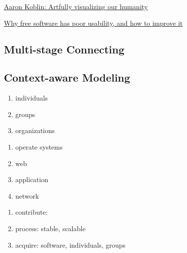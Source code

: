 \documentclass[draftclsnofoot,journal,onecolumn,12pt]{IEEEtran}
\begin{document}
\href{http://www.ted.com/talks/aaron_koblin.html}{Aaron Koblin: Artfully visualizing our humanity}

\href{http://www.mpt.net.nz/2012/06/why-free-software-has-poor-usability/}{Why free software has poor usability, and how to improve it}

\subsection{Multi-stage Connecting}

\subsection{Context-aware Modeling}


\begin{enumerate}
  \item individuals
  \item groups
  \item organizations
\end{enumerate}

\begin{enumerate}
  \item operate systems
  \item web
  \item application
  \item network
\end{enumerate}

\begin{enumerate}
  \item contribute:
  \item process: stable, scalable
  \item acquire: software, individuals, groups
\end{enumerate}


\nocite{Bonaccorsi20031243}
\nocite{chacon2009pro}
\nocite{Hertel20031159}
\nocite{kernighan1999practice}
\nocite{Kogut01062001}
\nocite{scacchi2006understanding}
\nocite{vonKrogh20031149}
\nocite{Yilmaz06techniquesand}

\renewcommand\refname{References}


\end{document}

